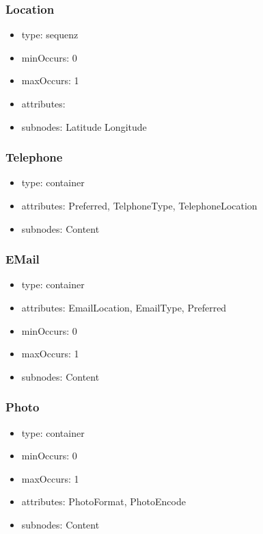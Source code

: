 \documentclass[a4paper,11pt]{article}
\begin{document}
\subsubsection{Location}
\begin{itemize}
  \item type: sequenz
  \item minOccurs: 0
  \item maxOccurs: 1
  \item attributes:
  \item subnodes:
  \subitem Latitude
  \subitem Longitude
\end{itemize}

\subsubsection{Telephone}
\begin{itemize}
  \item type: container
  \item attributes: Preferred, TelphoneType, TelephoneLocation
  \item subnodes:
  \subitem Content
\end{itemize}

\subsubsection{EMail}
\begin{itemize}
  \item type: container
  \item attributes: EmailLocation, EmailType, Preferred
  \item minOccurs: 0
  \item maxOccurs: 1
  \item subnodes:
  \subitem Content
\end{itemize}

\subsubsection{Photo}
\begin{itemize}
  \item type: container
  \item minOccurs: 0
  \item maxOccurs: 1
  \item attributes: PhotoFormat, PhotoEncode
  \item subnodes:
  \subitem Content
\end{itemize}
\end{document}
